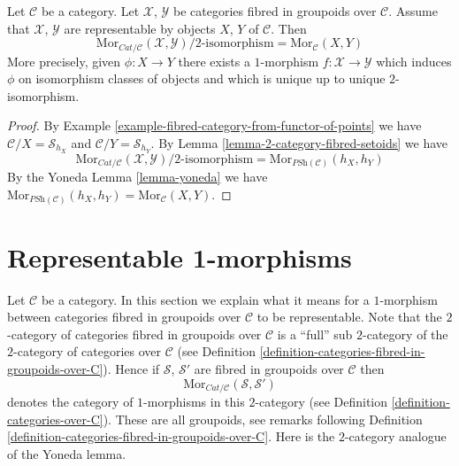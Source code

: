 \begin{lemma}
\label{lemma-morphisms-representable-fibred-categories}
Let $\mathcal{C}$ be a category.
Let $\mathcal{X}$, $\mathcal{Y}$ be categories fibred in groupoids
over $\mathcal{C}$. Assume that $\mathcal{X}$, $\mathcal{Y}$
are representable by objects $X$, $Y$ of $\mathcal{C}$.
Then
$$
\text{Mor}_{\textit{Cat}/\mathcal{C}}(\mathcal{X}, \mathcal{Y})
\Big/
2\text{-isomorphism}
=
\text{Mor}_{\mathcal{C}}(X, Y)
$$
More precisely, given $\phi : X \to Y$ there exists a
$1$-morphism $f : \mathcal{X} \to \mathcal{Y}$ which induces
$\phi$ on isomorphism classes of objects and
which is unique up to unique $2$-isomorphism.
\end{lemma}

\begin{proof}
By
Example \ref{example-fibred-category-from-functor-of-points}
we have $\mathcal{C}/X = \mathcal{S}_{h_X}$ and
$\mathcal{C}/Y = \mathcal{S}_{h_Y}$. By
Lemma \ref{lemma-2-category-fibred-setoids}
we have
$$
\text{Mor}_{\textit{Cat}/\mathcal{C}}(\mathcal{X}, \mathcal{Y})
\Big/
2\text{-isomorphism}
=
\text{Mor}_{\textit{PSh}(\mathcal{C})}(h_X, h_Y)
$$
By the Yoneda
Lemma \ref{lemma-yoneda}
we have $\text{Mor}_{\textit{PSh}(\mathcal{C})}(h_X, h_Y)
= \text{Mor}_{\mathcal{C}}(X, Y)$.
\end{proof}







\section{Representable 1-morphisms}
\label{section-representable-1-morphisms}

\noindent
Let $\mathcal{C}$ be a category.
In this section we explain what it means for a $1$-morphism
between categories fibred in groupoids over $\mathcal{C}$
to be representable. Note that the $2$-category of categories
fibred in groupoids over $\mathcal{C}$ is a
``full'' sub $2$-category of the $2$-category of categories over
$\mathcal{C}$ (see
Definition \ref{definition-categories-fibred-in-groupoids-over-C}).
Hence if $\mathcal{S}$, $\mathcal{S}'$ are fibred in groupoids
over $\mathcal{C}$ then
$$
\text{Mor}_{\textit{Cat}/\mathcal{C}}(\mathcal{S}, \mathcal{S}')
$$
denotes the category of $1$-morphisms in this $2$-category
(see Definition \ref{definition-categories-over-C}).
These are all groupoids, see remarks following
Definition \ref{definition-categories-fibred-in-groupoids-over-C}.
Here is the $2$-category analogue of the Yoneda lemma.

